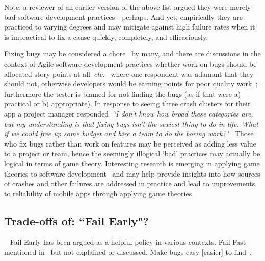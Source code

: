 Note: a reviewer of an earlier version of the above list argued they were merely bad software development practices - perhaps. And yet, empirically they are practiced to varying degrees and may mitigate against high failure rates when it is impractical to fix a cause quickly, completely, and efficaciously.

Fixing bugs may be considered a chore~ by many, and there are discussions in the context of Agile software development practices whether work on bugs should be allocated story points at all~\emph{etc.}~ where one respondent was adamant that they should not, otherwise developers would be earning points for poor quality work~; furthermore the tester is blamed for not finding the bugs (as if that were a) practical or b) appropriate). In response to seeing three crash clusters for their app a project manager responded~\emph{``I don’t know how broad these categories are, but my understanding is that fixing bugs isn’t the sexiest thing to do in life. What if we could free up some budget and hire a team to do the boring work?"}~  Those who fix bugs rather than work on features may be perceived as adding less value to a project or team, hence the seemingly illogical `bad' practices may actually be logical in terms of game theory. Interesting research is emerging in applying game theories to software development~ and may help provide insights into how sources of crashes and other failures are addressed in practice and lead to improvements to reliability of mobile apps through applying game theories.


\subsection{Trade-offs of: ``Fail Early"?}~\label{discussion-tradeoffs-of-fail-early-topic}
Fail Early has been argued as a helpful policy in various contexts. %
Fail Fast mentioned in~ but not explained or discussed. Make bugs easy [easier] to find~.

